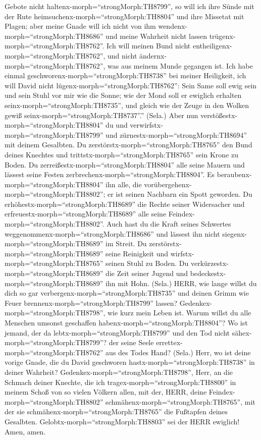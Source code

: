 Gebote nicht haltenx-morph=``strongMorph:TH8799'',  so will
ich ihre Sünde mit der Rute heimsuchenx-morph=``strongMorph:TH8804'' und
ihre Missetat mit Plagen;  aber meine Gnade will ich nicht
von ihm wendenx-morph=``strongMorph:TH8686'' und meine Wahrheit nicht
lassen trügenx-morph=``strongMorph:TH8762''.  Ich will
meinen Bund nicht entheiligenx-morph=``strongMorph:TH8762'', und nicht
ändernx-morph=``strongMorph:TH8762'', was aus meinem Munde gegangen ist.
 Ich habe einmal geschworenx-morph=``strongMorph:TH8738''
bei meiner Heiligkeit, ich will David nicht
lügenx-morph=``strongMorph:TH8762'':  Sein Same soll ewig
sein und sein Stuhl vor mir wie die Sonne;  wie der Mond
soll er ewiglich erhalten seinx-morph=``strongMorph:TH8735'', und gleich
wie der Zeuge in den Wolken gewiß seinx-morph=``strongMorph:TH8737''.''
(Sela.)  Aber nun verstößestx-morph=``strongMorph:TH8804''
du und verwirfstx-morph=``strongMorph:TH8799'' und
zürnestx-morph=``strongMorph:TH8694'' mit deinem Gesalbten.
 Du zerstörstx-morph=``strongMorph:TH8765'' den Bund deines
Knechtes und trittstx-morph=``strongMorph:TH8765'' sein Krone zu Boden.
 Du zerreißestx-morph=``strongMorph:TH8804'' alle seine
Mauern und lässest seine Festen
zerbrechenx-morph=``strongMorph:TH8804''.  Es
beraubenx-morph=``strongMorph:TH8804'' ihn alle, die
vorübergehenx-morph=``strongMorph:TH8802''; er ist seinen Nachbarn ein
Spott geworden.  Du erhöhestx-morph=``strongMorph:TH8689''
die Rechte seiner Widersacher und
erfreuestx-morph=``strongMorph:TH8689'' alle seine
Feindex-morph=``strongMorph:TH8802''.  Auch hast du die
Kraft seines Schwertes weggenommenx-morph=``strongMorph:TH8686'' und
lässest ihn nicht siegenx-morph=``strongMorph:TH8689'' im Streit.
 Du zerstörstx-morph=``strongMorph:TH8689'' seine
Reinigkeit und wirfstx-morph=``strongMorph:TH8765'' seinen Stuhl zu
Boden.  Du verkürzestx-morph=``strongMorph:TH8689'' die
Zeit seiner Jugend und bedeckestx-morph=``strongMorph:TH8689'' ihn mit
Hohn. (Sela.)  HERR, wie lange willst du dich so gar
verbergenx-morph=``strongMorph:TH8735'' und deinen Grimm wie Feuer
brennenx-morph=``strongMorph:TH8799'' lassen? 
Gedenkex-morph=``strongMorph:TH8798'', wie kurz mein Leben ist. Warum
willst du alle Menschen umsonst geschaffen
habenx-morph=``strongMorph:TH8804''?  Wo ist jemand, der da
lebtx-morph=``strongMorph:TH8799'' und den Tod nicht
sähex-morph=``strongMorph:TH8799''? der seine Seele
errettex-morph=``strongMorph:TH8762'' aus des Todes Hand? (Sela.)
 Herr, wo ist deine vorige Gnade, die du David geschworen
hastx-morph=``strongMorph:TH8738'' in deiner Wahrheit? 
Gedenkex-morph=``strongMorph:TH8798'', Herr, an die Schmach deiner
Knechte, die ich tragex-morph=``strongMorph:TH8800'' in meinem Schoß von
so vielen Völkern allen,  mit der, HERR, deine
Feindex-morph=``strongMorph:TH8802''
schmähenx-morph=``strongMorph:TH8765'', mit der sie
schmähenx-morph=``strongMorph:TH8765'' die Fußtapfen deines Gesalbten.
 Gelobtx-morph=``strongMorph:TH8803'' sei der HERR
ewiglich! Amen, amen.

